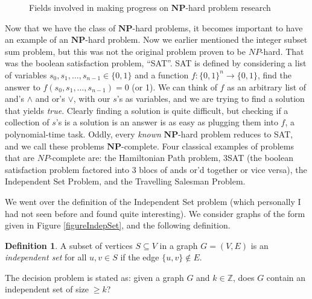 \documentclass[12pt]{amsart}
\theoremstyle{definition}
\newtheorem{definition}{Definition}
\theoremstyle{question}
\begin{document}
\begin{onehalfspace}
\begin{figure}
            \caption{Fields involved in making progress on $\mathbf{NP}$-hard problem research}
            \label{figureFields}
        \end{figure}

        Now that we have the class of $\mathbf{NP}$-hard problems, it becomes important to have an example
        of an $\mathbf{NP}$-hard problem.
        Now we earlier mentioned the integer subset sum problem, but this was not the original problem proven to
        be $NP$-hard.
        That was the boolean satisfaction problem, ``SAT''.
        SAT is defined by considering a list of variables $s_0,s_1,\ldots,s_{n-1} \in\{0,1\}$ and a function
        $f:\{0,1\}^n\rightarrow\{0,1\}$, find the answer to $f(s_0,s_1,\ldots,s_{n-1}) = 0$ (or 1).
        We can think of $f$ as an arbitrary list of and's $\land$ and or's $\lor$, with our $s$'s as variables,
        and we are trying to find a solution that yields \emph{true}.
        Clearly finding a solution is quite difficult, but checking if a collection of $s$'s is a solution is an answer
        is as easy as plugging them into $f$, a polynomial-time task.
        Oddly, every \emph{known} $\mathbf{NP}$-hard problem reduces to SAT, and we call these problems
        $\mathbf{NP}$-complete.
        Four classical examples of problems that are $NP$-complete are: the Hamiltonian Path problem, 3SAT (the boolean
        satisfaction problem factored into 3 blocs of ands or'd together or vice versa), the Independent Set Problem,
        and the Travelling Salesman Problem.

        We went over the definition of the Independent Set problem (which personally I had not seen before and found
        quite interesting).
        We consider graphs of the form given in Figure \ref{figureIndepSet}, and the following definition.
        \begin{definition}
            A subset of vertices $S\subseteq V$ in a graph $G = (V,E)$ is an \emph{independent set} for all $u,v\in S$
            if the edge $\{u,v\}\notin E$.
        \end{definition}
        The decision problem is stated as: given a graph $G$ and $k\in\mathbb{Z}$, does $G$ contain an independent set
        of size$\;\ge k$?


\end{onehalfspace}
\end{document}
